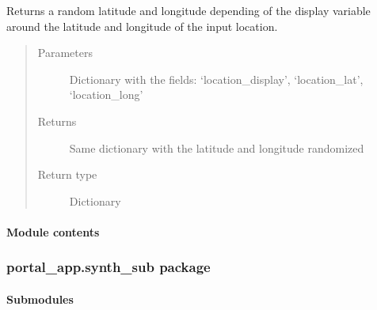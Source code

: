 \documentclass[letterpaper,10pt,english]{sphinxmanual}
\begin{document}
\begin{fulllineitems}
\label{\detokenize{CE_app.synth_phr:CE_app.synth_phr.synth_phr_func.func_nihpo_randomize}}
\sphinxAtStartPar
Returns a random latitude and longitude depending of the display variable around the
latitude and longitude of the input location.
\begin{quote}\begin{description}
\item[{Parameters}] \leavevmode
\sphinxAtStartPar
{} \textendash{} Dictionary with the fields: ‘location\_display’, ‘location\_lat’, ‘location\_long’

\item[{Returns}] \leavevmode
\sphinxAtStartPar
Same dictionary with the latitude and longitude randomized

\item[{Return type}] \leavevmode
\sphinxAtStartPar
Dictionary

\end{description}\end{quote}

\end{fulllineitems}



\paragraph{Module contents}
\label{\detokenize{CE_app.synth_phr:module-CE_app.synth_phr}}\label{\detokenize{CE_app.synth_phr:module-contents}}

\subsubsection{portal\_app.synth\_sub package}
\label{\detokenize{CE_app.synth_sub:portal-app-synth-sub-package}}\label{\detokenize{CE_app.synth_sub::doc}}

\paragraph{Submodules}
\label{\detokenize{CE_app.synth_sub:submodules}}
\end{document}

